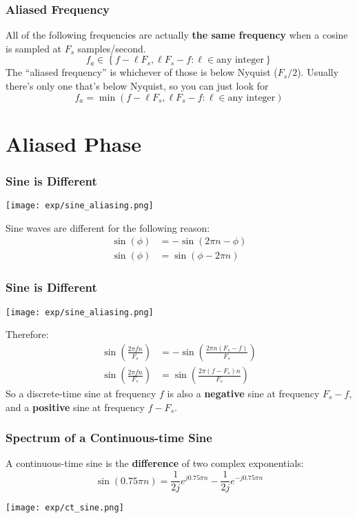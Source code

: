 \documentclass{beamer}
\begin{document}
\begin{frame}
  \frametitle{Aliased Frequency}

  All of the following frequencies are actually {\bf the same
    frequency} when a cosine is sampled at $F_s$ samples/second.
  \[
  f_a \in\left\{f - \ell F_s, \ell F_s - f : \ell\in \mbox{any integer}\right\}
  \]
  The ``aliased frequency'' is whichever of those is below Nyquist
  ($F_s/2$).  Usually there's only one that's below Nyquist, so you
  can just look for
  \[
  f_a =\min\left(f - \ell F_s, \ell F_s - f : \ell\in \mbox{any integer}\right)
  \]
  
\end{frame}

\section[Aliased Phase]{Aliased Phase}
\setcounter{subsection}{1}

\begin{frame}
  \frametitle{Sine is Different}

  \centerline{\texttt{[image: exp/sine\_aliasing.png]}}
  Sine waves are different for the following reason:
  \begin{align*}
    \sin(\phi) &= -\sin(2\pi n -\phi)\\
    \sin(\phi) &= \sin(\phi-2\pi n)
  \end{align*}
\end{frame}

\begin{frame}
  \frametitle{Sine is Different}
  \centerline{\texttt{[image: exp/sine\_aliasing.png]}}
  Therefore:
  \begin{align*}
    \sin\left(\frac{2\pi fn}{F_s}\right) &= -\sin\left(\frac{2\pi n(F_s-f)}{F_s}\right)\\
    \sin\left(\frac{2\pi fn}{F_s}\right) &= \sin\left(\frac{2\pi (f-F_s)n}{F_s}\right)
  \end{align*}
  So a discrete-time sine at frequency $f$ is also a {\bf negative} sine at
  frequency $F_s-f$, and a {\bf positive} sine at frequency $f-F_s$.
\end{frame}

\begin{frame}
  \frametitle{Spectrum of a Continuous-time Sine}

  A continuous-time sine is the {\bf difference} of two complex exponentials:
  \begin{displaymath}
    \sin(0.75\pi n)=\frac{1}{2j}e^{j0.75\pi n}-\frac{1}{2j}e^{-j0.75\pi n}
  \end{displaymath}
  \centerline{\texttt{[image: exp/ct\_sine.png]}}
\end{frame}
\end{document}
